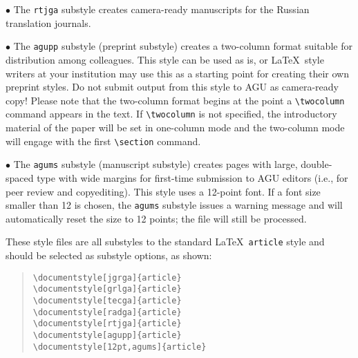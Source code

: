 \begin{article}
$\bullet$ The {\tt rtjga} substyle creates camera-ready 
       manuscripts for the Russian translation journals.
\vspace{10pt}

$\bullet$ The {\tt agupp} substyle (preprint substyle) 
   creates a two-column format suitable for 
       distribution among colleagues.  This style can 
         be used as is, or \LaTeX\ style writers at your 
        institution may use this as a starting point for 
       creating their own preprint styles.  Do not submit 
     output from this style to AGU as camera-ready copy!
     Please note that the two-column format begins 
          at the point a \verb"\twocolumn" command appears 
       in the text.  If \verb"\twocolumn" is not 
      specified, the introductory material of the paper 
      will be set in one-column mode and the two-column 
      mode will engage with the first \verb"\section" 
        command.
\vspace{10pt}

$\bullet$ The {\tt agums} substyle (manuscript substyle)
   creates pages with large, double-spaced type with 
      wide margins for first-time submission to AGU 
          editors (i.e., for peer review and copyediting).
        This style uses a 12-point font.  If a font size 
       smaller than 12 is chosen, the {\tt agums} substyle 
    issues a warning message and will automatically 
        reset the size to 12 points; the file will still 
       be processed.
\vspace{10pt}

These style files are all substyles to the standard 
\LaTeX\ {\tt article} style and should be selected 
as substyle options, as shown:

\begin{center}
\begin{quote}
\verb"\documentstyle[jgrga]{article}" \\
\verb"\documentstyle[grlga]{article}" \\
\verb"\documentstyle[tecga]{article}" \\
\verb"\documentstyle[radga]{article}" \\
\verb"\documentstyle[rtjga]{article}" \\
\verb"\documentstyle[agupp]{article}" \\
\verb"\documentstyle[12pt,agums]{article}"
\end{quote}
\end{center}


\end{article}
